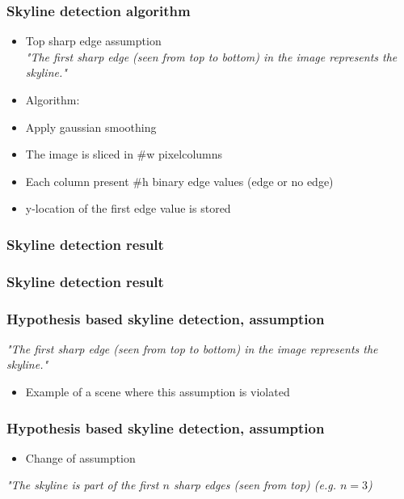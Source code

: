 \documentclass{beamer}
\begin{document}
\frame
{
	\frametitle{Skyline detection algorithm}%
	\begin{itemize}
		\item <+-| alert@+> Top sharp edge assumption\\
		\emph{"The first sharp edge (seen from top to bottom) in the image represents the skyline."}
		\item Algorithm:
		\item <+-| alert@+> Apply gaussian smoothing
		\item <+-| alert@+> The image is sliced in \#w pixelcolumns
		\item <+-| alert@+> Each column present \#h binary edge values (edge or no edge)
		\item <+-| alert@+> y-location of the first edge value is stored 
	\end{itemize}
}



\frame
{
	\frametitle{Skyline detection result}%
}

\frame
{
	\frametitle{Skyline detection result}%
}

\frame
{
	\frametitle{Hypothesis based skyline detection, assumption}
	\emph{"The first sharp edge (seen from top to bottom) in the image represents the skyline."}
	\begin{itemize}
	\item <+-| alert@+> Example of a scene where this assumption is violated
	\end{itemize}
}

\frame
{
	\frametitle{Hypothesis based skyline detection, assumption}
	\begin{itemize}
	\item <+-| alert@+> Change of assumption
	\end{itemize}
	\emph{"The skyline is part of the first $n$ sharp edges (seen from top) (e.g.
	$n=3$)}
}
\end{document}
